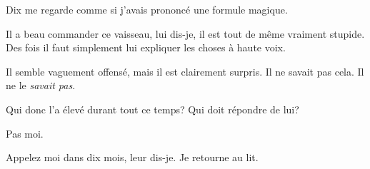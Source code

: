 Dix me regarde comme si j'avais prononcé une formule magique.

\og Il a beau commander ce vaisseau,\fg{} lui dis-je, \og il est tout de même vraiment stupide. Des fois il faut simplement lui expliquer les choses à haute voix.\fg

Il semble vaguement offensé, mais il est clairement surpris. Il ne savait pas cela. Il ne le \emph{savait pas}.

Qui donc l'a élevé durant tout ce temps? Qui doit répondre de lui?

Pas moi.

\og Appelez moi dans dix mois\fg , leur dis-je. \og Je retourne au lit.\fg